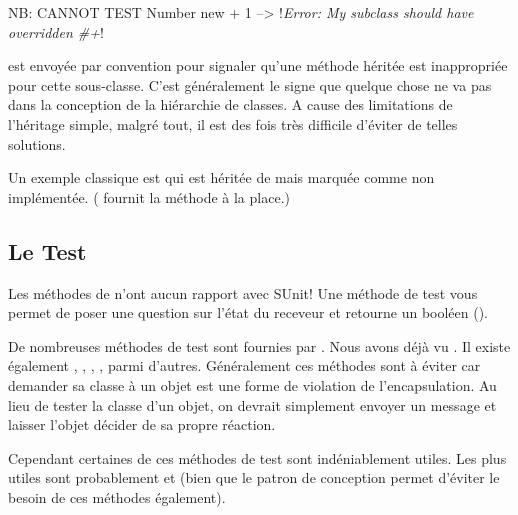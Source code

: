 \documentclass[a4paper,10pt,twoside]{book}
\begin{document}
\begin{code}{NB: CANNOT TEST}
Number new + 1 --> !\emph{Error: My subclass should have overridden \#+}!
\end{code}

 est envoyée par convention pour signaler qu'une méthode héritée est inappropriée pour cette sous-classe. C'est généralement le signe que quelque chose ne va pas dans la conception de la hiérarchie de classes. A cause des limitations de l'héritage simple, malgré tout, il est des fois très difficile d'éviter de telles solutions.

Un exemple classique est  qui est héritée de  mais marquée comme non implémentée. ( fournit la méthode  à la place.)



\subsection{Le Test}

Les méthodes de  n'ont aucun rapport avec SUnit! Une méthode de test vous permet de poser une question sur l'état du receveur et retourne un booléen ().

De nombreuses méthodes de test sont fournies par . Nous avons déjà vu . Il existe également , , , , parmi d'autres. Généralement ces méthodes sont à éviter car demander sa classe à un objet est une forme de violation de l'encapsulation. Au lieu de tester la classe d'un objet, on devrait simplement envoyer un message et laisser l'objet décider de sa propre réaction.

Cependant certaines de ces méthodes de test sont indéniablement utiles. Les plus utiles sont probablement  et  (bien que le patron de conception \cite{Wool98a} permet d'éviter le besoin de ces méthodes également).
\end{document}
